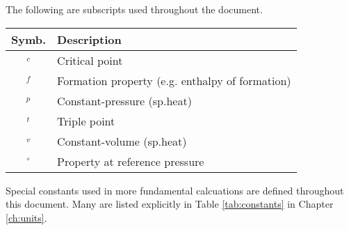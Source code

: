 The following are subscripts used throughout the document.

\vspace{1em}
\begin{tabular}{|cl|}
\hline
Symb. & Description\\
\hline
$_c$ & Critical point\\
$_f$ & Formation property (e.g. enthalpy of formation)\\
$_p$ & Constant-pressure (sp.heat)\\
$_t$ & Triple point\\
$_v$ & Constant-volume (sp.heat)\\
$^\circ$ & Property at reference pressure\\
\hline
\end{tabular}

Special constants used in more fundamental calcuations are defined throughout this document.  Many are listed explicitly in Table \ref{tab:constants} in Chapter \ref{ch:units}.
